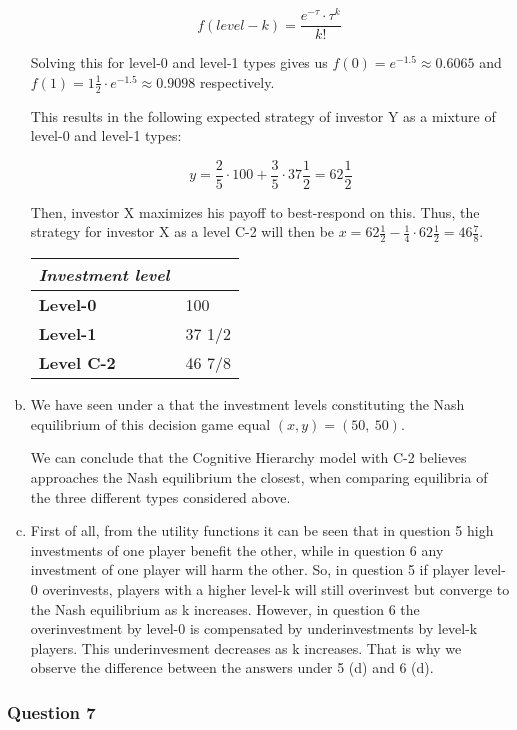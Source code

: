 \documentclass[a4paper]{article}
\begin{document}
\begin{enumerate}[(a)]
\[f\left( level - k \right) = \frac{e^{- \tau} \cdot \tau^{k}}{k!}\ \]

Solving this for level-0 and level-1 types gives us
\(f\left( 0 \right) = e^{- 1.5} \approx 0.6065\) and
\(f\left( 1 \right) = 1\frac{1}{2} \cdot e^{- 1.5} \approx 0.9098\)
respectively.

This results in the following expected strategy of investor Y as a
mixture of level-0 and level-1 types:

\[y = \frac{2}{5} \cdot 100 + \frac{3}{5} \cdot 37\frac{1}{2} = 62\frac{1}{2}\]

Then, investor X maximizes his payoff to best-respond on this. Thus, the
strategy for investor X as a level C-2 will then be
\(x = 62\frac{1}{2} - \frac{1}{4} \cdot 62\frac{1}{2} = 46\frac{7}{8}\).

\begin{longtable}[]{@{}ll@{}}
\toprule
\emph{Investment level }\tabularnewline
\midrule

\textbf{Level-0} & 100\tabularnewline
\textbf{Level-1} & 37 1/2\tabularnewline
\textbf{Level C-2} & 46 7/8\tabularnewline
\bottomrule
\end{longtable}


\item
We have seen under a that the investment levels constituting the Nash
equilibrium of this decision game equal
\(\left( x,y \right) = (50,\ 50)\).

We can conclude that the Cognitive Hierarchy model with C-2 believes
approaches the Nash equilibrium the closest, when comparing equilibria
of the three different types considered above.

\item
First of all, from the utility functions it can be seen that in question 5 high investments of one player benefit the other, while in question 6 any investment of one player will harm the other. So, in question 5 if player level-0 overinvests, players with a higher level-k will still overinvest but converge to the Nash equilibrium as k increases. However, in question 6 the overinvestment by level-0 is compensated by underinvestments by level-k players. This underinvesment decreases as k increases. That is why we observe the difference between the answers under 5 (d) and 6 (d).


\end{enumerate}

\subsubsection{Question 7}
\end{document}
